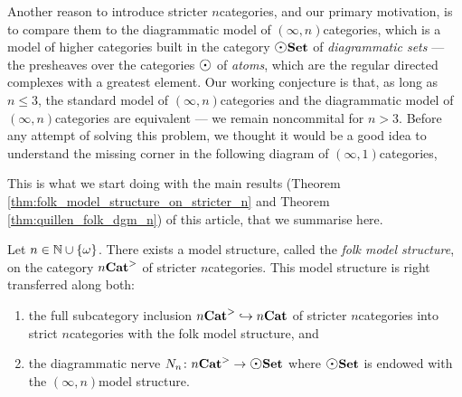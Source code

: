 Another reason to introduce stricter \( n \)\nbd categories, and our primary motivation, is to compare them to the diagrammatic model of \( (\infty, n) \)\nbd categories, which is a model of higher categories \cite{chanavat2024htpy,chanavat2024model} built in the category \( \dgmSet \) of \emph{diagrammatic sets} --- the presheaves over the categories \( \atom \) of \emph{atoms}, which are the regular directed complexes with a greatest element.  
Our working conjecture is that, as long as \( n \le 3 \), the standard model of \( (\infty, n) \)\nbd categories \cite{barwick2020unicity} and the diagrammatic model of \( (\infty, n) \)\nbd categories are equivalent --- we remain noncommital for \( n > 3 \).
Before any attempt of solving this problem, we thought it would be a good idea to understand the missing corner in the following diagram of \( (\infty, 1) \)\nbd categories,
\begin{center}
\end{center}
This is what we start doing with the main results (Theorem \ref{thm:folk_model_structure_on_stricter_n} and Theorem \ref{thm:quillen_folk_dgm_n}) of this article, that we summarise here.
\begin{thm*}
    Let \( n \in \mathbb{N} \cup \left\{ {\omega} \right\} \).
    There exists a model structure, called the \emph{folk model structure}, on the category \( {n\mathbf{Cat}}^> \) of stricter \( n \)\nbd categories.
    This model structure is right transferred along both:
    \begin{enumerate}
        \item the full subcategory inclusion \( {n\mathbf{Cat}}^> \hookrightarrow {n\mathbf{Cat}} \) of stricter \( n \)\nbd categories into strict \( n \)\nbd categories with the folk model structure, and
        \item the diagrammatic nerve \( \N{n} \colon \snCat{n} \to \dgmSet \) where \( \dgmSet \) is endowed with the \( (\infty, n) \)\nbd model structure. 
    \end{enumerate}
\end{thm*}
